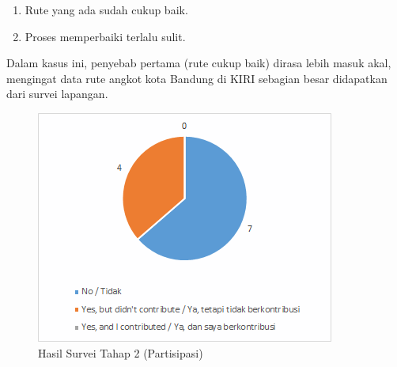 \begin{enumerate}
	\item Rute yang ada sudah cukup baik.
	\item Proses memperbaiki terlalu sulit.
\end{enumerate}

Dalam kasus ini, penyebab pertama (rute cukup baik) dirasa lebih masuk akal, mengingat data rute angkot kota Bandung di KIRI sebagian besar didapatkan dari survei lapangan.

\begin{figure}
	\centering
	\includegraphics[scale=0.75]{Gambar/5_hasilsurvei_2_3}
	\caption{Hasil Survei Tahap 2 (Partisipasi)} 
	\label{fig:5_hasilsurvei_2_3}
\end{figure}